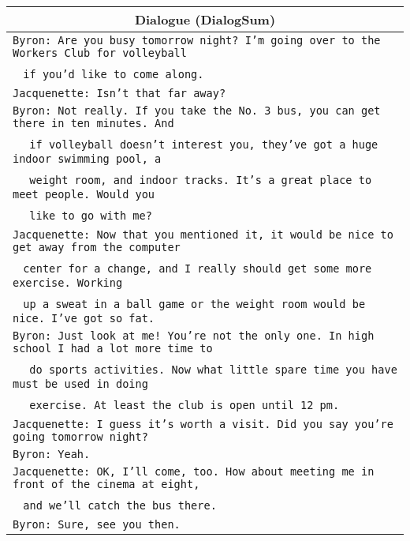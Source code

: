 \documentclass[11pt]{article}
\begin{document}
\begin{table*}[t]
        \centering
        \begin{adjustbox}{width=1.00\textwidth,center}
        \begin{tabular}{ | l |}
        \toprule
        \multicolumn{1}{|c|}{\textbf{Dialogue (DialogSum)}} \\ 
        \hline
        \texttt{Byron: Are you busy tomorrow night? I'm going over to the Workers Club for volleyball } \\ 
        \quad\quad\quad~ \texttt{if you'd like to come along.} \\
        \texttt{Jacquenette: Isn't that far away?} \\
        \texttt{Byron: Not really. If you take the No. 3 bus, you can get there in ten minutes. And} \\
        \quad\quad\quad~~ \texttt{if volleyball doesn't interest you, they've got a huge indoor swimming pool, a} \\
        \quad\quad\quad~~ \texttt{weight room, and indoor tracks. It's a great place to meet people. Would you} \\
        \quad\quad\quad~~ \texttt{like to go with me?} \\
        \texttt{Jacquenette: Now that you mentioned it, it would be nice to get away from the computer} \\
        \quad\quad\quad\quad\quad\quad~ \texttt{center for a change, and I really should get some more exercise. Working} \\
        \quad\quad\quad\quad\quad\quad~ \texttt{up a sweat in a ball game or the weight room would be nice. I've got so fat.} \\
        \texttt{Byron: Just look at me! You're not the only one. In high school I had a lot more time to} \\
        \quad\quad\quad~~ \texttt{do sports activities. Now what little spare time you have must be used in doing} \\
        \quad\quad\quad~~ \texttt{exercise. At least the club is open until 12 pm.} \\
        \texttt{Jacquenette: I guess it's worth a visit. Did you say you're going tomorrow night?}\\
        \texttt{Byron: Yeah.} \\
        \texttt{Jacquenette: OK, I'll come, too. How about meeting me in front of the cinema at eight,} \\
        \quad\quad\quad\quad\quad\quad~ \texttt{and we'll catch the bus there.} \\
        \texttt{Byron: Sure, see you then.} \\ \hline
        

\end{tabular}
\end{adjustbox}
\end{table*}
\end{document}
